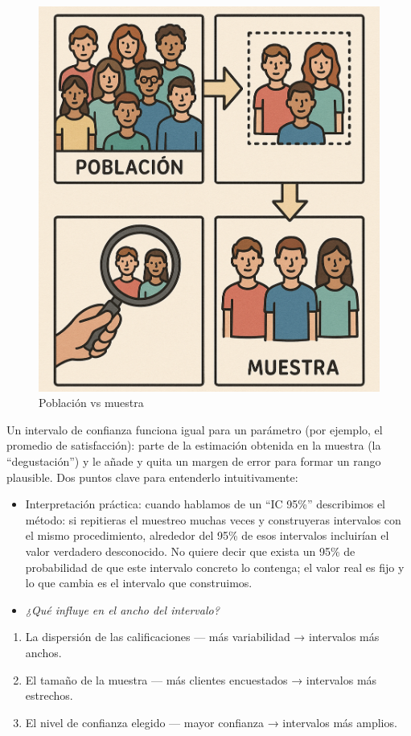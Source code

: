 \documentclass[
  spanish,
  letterpaper,
  DIV=11,
  numbers=noendperiod]{scrreprt}
\providecommand{\tightlist}{%
  \setlength{\itemsep}{0pt}\setlength{\parskip}{0pt}}
\begin{document}
\begin{figure}[H]

{\centering \includegraphics[width=0.4\linewidth,height=\textheight,keepaspectratio]{img/muestra.png}

}

\caption{Población vs muestra}

\end{figure}%

Un intervalo de confianza funciona igual para un parámetro (por ejemplo,
el promedio de satisfacción): parte de la estimación obtenida en la
muestra (la ``degustación'') y le añade y quita un margen de error para
formar un rango plausible. Dos puntos clave para entenderlo
intuitivamente:

\begin{itemize}
\item
  Interpretación práctica: cuando hablamos de un ``IC 95\%'' describimos
  el método: si repitieras el muestreo muchas veces y construyeras
  intervalos con el mismo procedimiento, alrededor del 95\% de esos
  intervalos incluirían el valor verdadero desconocido. No quiere decir
  que exista un 95\% de probabilidad de que este intervalo concreto lo
  contenga; el valor real es fijo y lo que cambia es el intervalo que
  construimos.
\item
  \emph{¿Qué influye en el ancho del intervalo?}
\end{itemize}

\begin{enumerate}
\def\labelenumi{\arabic{enumi}.}
\tightlist
\item
  La dispersión de las calificaciones --- más variabilidad → intervalos
  más anchos.
\item
  El tamaño de la muestra --- más clientes encuestados → intervalos más
  estrechos.
\item
  El nivel de confianza elegido --- mayor confianza → intervalos más
  amplios.
\end{enumerate}
\end{document}
